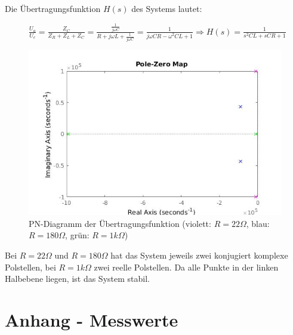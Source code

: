 \documentclass[12pt,a4paper,titlepage]{article}
\begin{document}
\noindent Die \"Ubertragungsfunktion $H(s)$ des Systems lautet:
\begin{figure}[H]
  \centering
  $\frac{U_a}{U_e} = \frac{Z_C}{Z_R+Z_L+Z_C} = \frac{\frac{1}{j\omega C}}{R+j\omega L+\frac{1}{j\omega C}} = \frac{1}{j\omega CR-\omega^2CL+1} \Rightarrow H(s) = \frac{1}{s^2CL+sCR+1}$
\end{figure}


\begin{figure}[H]
  \centering
  \includegraphics[width=150mm]{pnd.jpg}
  \caption{PN-Diagramm der \"Ubertragungsfunktion (violett: $R=22\Omega$, blau: $R=180\Omega$, gr\"un: $R=1k\Omega$)}
\end{figure}

\noindent Bei $R=22\Omega$ und $R=180\Omega$ hat das System jeweils zwei konjugiert komplexe Polstellen, bei $R=1k\Omega$ zwei reelle Polstellen. Da alle Punkte in der linken Halbebene liegen, ist das System stabil.

\section{Anhang - Messwerte}
\end{document}
